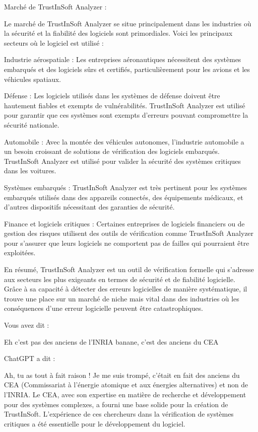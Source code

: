 \documentclass[a4paper,11pt]{article}
\begin{document}
Marché de TrustInSoft Analyzer :

Le marché de TrustInSoft Analyzer se situe principalement dans les industries où
la sécurité et la fiabilité des logiciels sont primordiales. Voici les
principaux secteurs où le logiciel est utilisé :

Industrie aérospatiale : Les entreprises aéronautiques nécessitent des systèmes
embarqués et des logiciels sûrs et certifiés, particulièrement pour les avions
et les véhicules spatiaux.

Défense : Les logiciels utilisés dans les systèmes de défense doivent être
hautement fiables et exempts de vulnérabilités. TrustInSoft Analyzer est utilisé
pour garantir que ces systèmes sont exempts d'erreurs pouvant compromettre la
sécurité nationale.

Automobile : Avec la montée des véhicules autonomes, l'industrie automobile a un
besoin croissant de solutions de vérification des logiciels
embarqués. TrustInSoft Analyzer est utilisé pour valider la sécurité des
systèmes critiques dans les voitures.

Systèmes embarqués : TrustInSoft Analyzer est très pertinent pour les systèmes
embarqués utilisés dans des appareils connectés, des équipements médicaux, et
d'autres dispositifs nécessitant des garanties de sécurité.

Finance et logiciels critiques : Certaines entreprises de logiciels financiers
ou de gestion des risques utilisent des outils de vérification comme TrustInSoft
Analyzer pour s'assurer que leurs logiciels ne comportent pas de failles qui
pourraient être exploitées.

En résumé, TrustInSoft Analyzer est un outil de vérification formelle qui
s'adresse aux secteurs les plus exigeants en termes de sécurité et de fiabilité
logicielle. Grâce à sa capacité à détecter des erreurs logicielles de manière
systématique, il trouve une place sur un marché de niche mais vital dans des
industries où les conséquences d'une erreur logicielle peuvent être
catastrophiques.


Vous avez dit :

Eh c'est pas des anciens de l'INRIA banane, c'est des anciens du CEA

ChatGPT a dit :

Ah, tu as tout à fait raison ! Je me suis trompé, c'était en fait des anciens du
CEA (Commissariat à l'énergie atomique et aux énergies alternatives) et non de
l'INRIA. Le CEA, avec son expertise en matière de recherche et développement
pour des systèmes complexes, a fourni une base solide pour la création de
TrustInSoft. L'expérience de ces chercheurs dans la vérification de systèmes
critiques a été essentielle pour le développement du logiciel.
\end{document}
